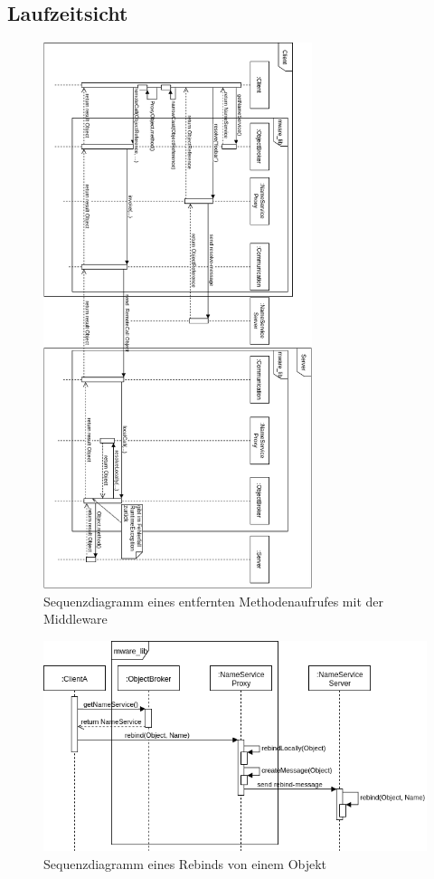 \documentclass{article}
\begin{document}
\subsection{Laufzeitsicht}
\begin{figure}[H]
    \centering
    \includegraphics[width=0.7\textwidth]{full-sequence.png}
    \caption[full-seq-diagram]{Sequenzdiagramm eines entfernten Methodenaufrufes mit der Middleware}
    \label{fig:full-seq-diagram}
\end{figure}

\begin{figure}[H]
    \centering
    \includegraphics[width=\textwidth]{rebind-seq.png}
    \caption[rebind-seq-diagram]{Sequenzdiagramm eines Rebinds von einem Objekt}
    \label{fig:full-seq-diagram}
\end{figure}
\end{document}
